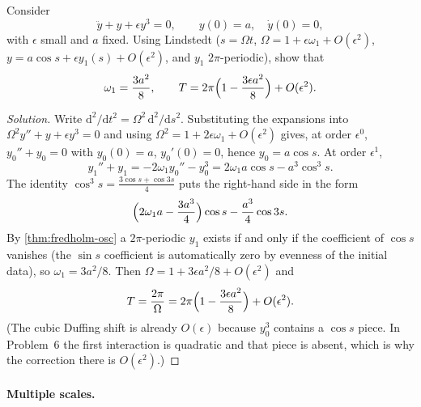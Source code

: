 \documentclass[11pt,a4paper]{article}
\begin{document}
\begin{exercise}
\label{exer:duffing-period}
Consider
\[
\ddot y+y+\epsilon y^{3}=0,
\qquad
y(0)=a,\quad \dot y(0)=0,
\]
with \(\epsilon\) small and \(a\) fixed. Using Lindstedt (\(s=\Omega t\), \(\Omega=1+\epsilon\omega_{1}+O(\epsilon^{2})\), \(y=a\cos s+\epsilon y_{1}(s)+O(\epsilon^{2})\), and \(y_{1}\) \(2\pi\)-periodic), show that
\[
\omega_{1}=\frac{3a^{2}}{8},
\qquad
T
=
2\pi\Bigl(1-\frac{3\epsilon a^{2}}{8}\Bigr)+O(\epsilon^{2}).
\]
\end{exercise}

\begin{proof}[Solution]
Write \(\mathrm{d}^{2}/\mathrm{d}t^{2}=\Omega^{2}\,\mathrm{d}^{2}/\mathrm{d}s^{2}\). Substituting the expansions into \(\Omega^{2} y''+y+\epsilon y^{3}=0\) and using \(\Omega^{2}=1+2\epsilon\omega_{1}+O(\epsilon^{2})\) gives, at order \(\epsilon^{0}\), \(y_{0}''+y_{0}=0\) with \(y_{0}(0)=a\), \(y_{0}'(0)=0\), hence \(y_{0}=a\cos s\). At order \(\epsilon^{1}\),
\[
y_{1}''+y_{1}
=
-2\omega_{1} y_{0}''-y_{0}^{3}
=
2\omega_{1} a\cos s-a^{3}\cos^{3}s.
\]
The identity \(\cos^{3}s=\frac{3\cos s+\cos 3s}{4}\) puts the right-hand side in the form
\[
\Bigl(2\omega_{1} a-\frac{3a^{3}}{4}\Bigr)\cos s-\frac{a^{3}}{4}\cos 3s.
\]
By \cref{thm:fredholm-osc} a \(2\pi\)-periodic \(y_{1}\) exists if and only if the coefficient of \(\cos s\) vanishes (the \(\sin s\) coefficient is automatically zero by evenness of the initial data), so \(\omega_{1}=3a^{2}/8\). Then \(\Omega=1+3\epsilon a^{2}/8+O(\epsilon^{2})\) and
\[
T=\frac{2\pi}{\Omega}=2\pi\Bigl(1-\frac{3\epsilon a^{2}}{8}\Bigr)+O(\epsilon^{2}).
\]
(The cubic Duffing shift is already \(O(\epsilon)\) because \(y_{0}^{3}\) contains a \(\cos s\) piece. In Problem~6 the first interaction is quadratic and that piece is absent, which is why the correction there is \(O(\epsilon^{2})\).)
\end{proof}

\paragraph{Multiple scales.}
\end{document}
